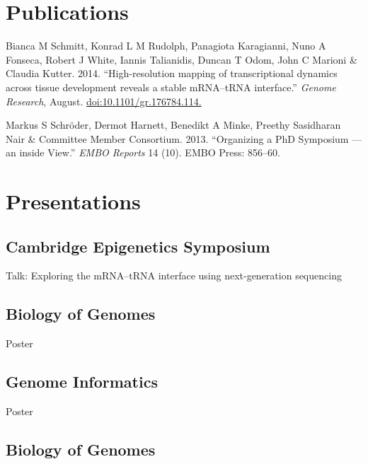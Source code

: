 \documentclass{klmr-cv}
\begin{document}
\date{Jan 2007--Jan 2008}
\item{}

\section{Publications}

\item{Bianca M Schmitt, Konrad L M Rudolph, Panagiota Karagianni, Nuno A
    Fonseca, Robert J White, Iannis Talianidis, Duncan T Odom, John C Marioni
    \& Claudia Kutter. 2014. “High-resolution mapping of transcriptional
    dynamics across tissue development reveals a stable mRNA–tRNA interface.”
    \textit{Genome Research}, August.
    \href{http://dx.doi.org/10.1101/gr.176784.114.}{doi:10.1101/gr.176784.114.}}
\item{Markus S Schröder, Dermot Harnett, Benedikt A Minke, Preethy Sasidharan
    Nair \& Committee Member Consortium. 2013. “Organizing a PhD Symposium ---
    an inside View.” \textit{EMBO Reports} 14 (10). EMBO Press: 856–60.}

\section{Presentations}

\subsection{Cambridge Epigenetics Symposium}

\date{2014}
\item{Talk: Exploring the mRNA--tRNA interface using next-generation sequencing}

\subsection{Biology of Genomes}

\date{2015}
\item{Poster}

\subsection{Genome Informatics}

\date{2014}
\item{Poster}

\subsection{Biology of Genomes}
\end{document}
